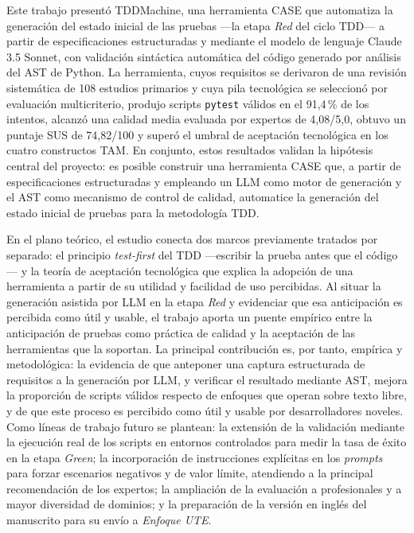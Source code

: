 \documentclass[10pt,journal,twoside,letterpaper]{IEEEtran}
\begin{document}
	Este trabajo presentó TDDMachine, una herramienta CASE que automatiza la generación del estado inicial de las pruebas ---la etapa \emph{Red} del ciclo TDD--- a partir de especificaciones estructuradas y mediante el modelo de lenguaje Claude 3.5 Sonnet, con validación sintáctica automática del código generado por análisis del AST de Python. La herramienta, cuyos requisitos se derivaron de una revisión sistemática de 108 estudios primarios y cuya pila tecnológica se seleccionó por evaluación multicriterio, produjo scripts \texttt{pytest} válidos en el 91,4\,\% de los intentos, alcanzó una calidad media evaluada por expertos de 4,08/5,0, obtuvo un puntaje SUS de 74,82/100 y superó el umbral de aceptación tecnológica en los cuatro constructos TAM. En conjunto, estos resultados validan la hipótesis central del proyecto: es posible construir una herramienta CASE que, a partir de especificaciones estructuradas y empleando un LLM como motor de generación y el AST como mecanismo de control de calidad, automatice la generación del estado inicial de pruebas para la metodología TDD.
	
	En el plano teórico, el estudio conecta dos marcos previamente tratados por separado: el principio \emph{test-first} del TDD ---escribir la prueba antes que el código--- y la teoría de aceptación tecnológica que explica la adopción de una herramienta a partir de su utilidad y facilidad de uso percibidas. Al situar la generación asistida por LLM en la etapa \emph{Red} y evidenciar que esa anticipación es percibida como útil y usable, el trabajo aporta un puente empírico entre la anticipación de pruebas como práctica de calidad y la aceptación de las herramientas que la soportan. La principal contribución es, por tanto, empírica y metodológica: la evidencia de que anteponer una captura estructurada de requisitos a la generación por LLM, y verificar el resultado mediante AST, mejora la proporción de scripts válidos respecto de enfoques que operan sobre texto libre, y de que este proceso es percibido como útil y usable por desarrolladores noveles. Como líneas de trabajo futuro se plantean: la extensión de la validación mediante la ejecución real de los scripts en entornos controlados para medir la tasa de éxito en la etapa \emph{Green}; la incorporación de instrucciones explícitas en los \emph{prompts} para forzar escenarios negativos y de valor límite, atendiendo a la principal recomendación de los expertos; la ampliación de la evaluación a profesionales y a mayor diversidad de dominios; y la preparación de la versión en inglés del manuscrito para su envío a \emph{Enfoque UTE}.
	
\end{document}
